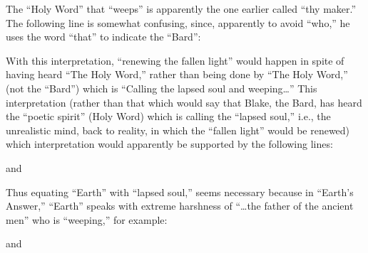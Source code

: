 The \enquote{Holy Word} that \enquote{weeps} is apparently the one earlier called \enquote{thy maker.} The following line is somewhat confusing,
since, apparently to avoid \enquote{who,} he uses the word \enquote{that} to indicate the \enquote{Bard}:


With this interpretation, \enquote{renewing the fallen light} would happen in spite of having heard \enquote{The Holy Word,} rather
than being done by \enquote{The Holy Word,} (not the \enquote{Bard}) which is \enquote{Calling the lapsed soul and weeping\dots} This interpretation
(rather than that which would say that Blake, the Bard, has heard the \enquote{poetic spirit} (Holy Word) which is calling the \enquote{lapsed soul,}
i.e., the unrealistic mind, back to reality, in which the \enquote{fallen light} would be renewed) which interpretation would
apparently be supported by the following lines:

\clearpage


{
	\centering
	and\par
}


Thus equating \enquote{Earth} with \enquote{lapsed soul,} seems necessary because in \enquote{Earth's Answer,} \enquote{Earth} speaks
with extreme harshness of \enquote{\dots the father of the ancient men} who is \enquote{weeping,} for example:


{
	\centering
	and\par
}


